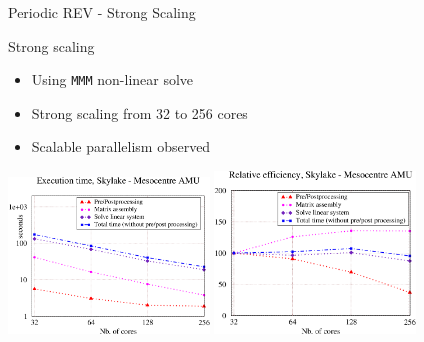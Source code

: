 \documentclass{beamer}
\newcommand{\mmm}{\texttt{MMM}}
\begin{document}
\begin{frame}{Periodic
    REV - Strong Scaling}
  \begin{block}{Strong
      scaling}
    \begin{itemize}
      \item Using \mmm{} non-linear solve
      \item Strong scaling from 32 to 256 cores
      \item Scalable parallelism observed
    \end{itemize}
  \end{block}
  \begin{block}{}
    \includegraphics[width=0.4\textwidth]{img/bench_3.png}
    \includegraphics[width=0.4\textwidth]{img/bench_4.png}
  \end{block}
\end{frame}
\end{document}
